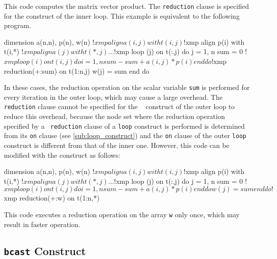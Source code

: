 \begin{description}
This code computes the matrix vector product.
The {\tt reduction} clause is specified for the {\tt {}}
construct of the inner loop. This example is equivalent to the following
program.

\begin{Fexample}
      dimension a(n,n), p(n), w(n)
!$xmp align a(i,j) with t(i,j)
!$xmp align p(i) with t(i,*)
!$xmp align a(j) with t(*,j)
      ...
!$xmp loop (j) on t(:,j)
      do j = 1, n
          sum = 0
!$xmp loop (i) on t(i,j) 
          do i = 1, n
              sum - sum + a(i,j) * p(i)
          end do
!$xmp reduction(+:sum) on t(1:n,j)
          w(j) = sum
      end do
\end{Fexample}

In these cases, the reduction operation on the scalar variable {\tt sum}
is performed for every iteration in the outer loop, which may cause a
large overhead.
The {\tt reduction} clause cannot be specified for the {\tt
{}} construct of the outer loop to reduce this overhead,
%
because the node set where the reduction operation specified by a {\tt
reduction} clause of a {\tt loop} construct is performed is determined
from its {\tt on} clause (see \ref{sub:loop_construct}) and
the {\tt on} clause of the outer {\tt loop} construct is different from
that of the inner one. 
%
However, this code can be modified with the {\tt {}}
construct as follows: 

\begin{Fexample}
      dimension a(n,n), p(n), w(n)
!$xmp align a(i,j) with t(i,j)
!$xmp align p(i) with t(i,*)
!$xmp align a(j) with t(*,j)
      ...
!$xmp loop (j) on t(:,j)
      do j = 1, n
          sum = 0
!$xmp loop (i) on t(i,j) 
          do i = 1, n
              sum - sum + a(i,j) * p(i)
          end do
          w(j) = sum
      end do
!$xmp reduction(+:w) on t(1:n,*)
\end{Fexample}

This code executes a reduction operation on the array {\tt w} only once,
which may result in faster operation.  

\end{description}


\subsection{{\tt bcast} Construct}

